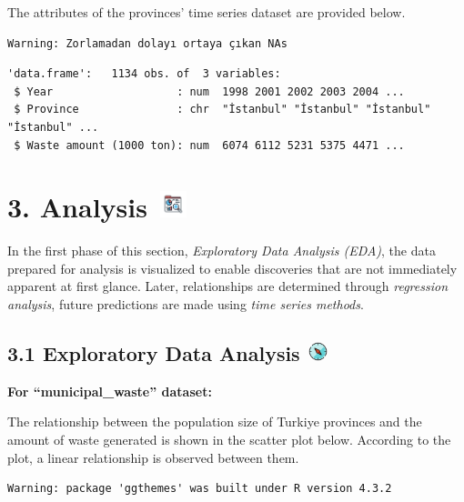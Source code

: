 \documentclass[
  11pt,
  a4paper,
  DIV=11,
  numbers=noendperiod]{scrartcl}
\begin{document}
The attributes of the provinces' time series dataset are provided below.

\begin{verbatim}
Warning: Zorlamadan dolayı ortaya çıkan NAs
\end{verbatim}

\begin{verbatim}
'data.frame':   1134 obs. of  3 variables:
 $ Year                   : num  1998 2001 2002 2003 2004 ...
 $ Province               : chr  "İstanbul" "İstanbul" "İstanbul" "İstanbul" ...
 $ Waste amount (1000 ton): num  6074 6112 5231 5375 4471 ...
\end{verbatim}

\section[{3. Analysis} ]{\texorpdfstring{{3. Analysis}
\protect\includegraphics[width=0.375in,height=0.30208in]{assets/images/analysis.jpg}}{3. Analysis }}\label{analysis}

In the first phase of this section, \emph{Exploratory Data Analysis
(EDA)}, the data prepared for analysis is visualized to enable
discoveries that are not immediately apparent at first glance. Later,
relationships are determined through \emph{regression analysis}, future
predictions are made using \emph{time series methods}.

\subsection[{3.1 Exploratory Data Analysis} ]{\texorpdfstring{{3.1
Exploratory Data Analysis}
\protect\includegraphics[width=0.23958in,height=0.21875in]{assets/images/EDA.jpg}}{3.1 Exploratory Data Analysis }}\label{exploratory-data-analysis}

{\textbf{For ``municipal\_waste'' dataset:}}

The relationship between the population size of Turkiye provinces and
the amount of waste generated is shown in the scatter plot below.
According to the plot, a linear relationship is observed between them.

\begin{verbatim}
Warning: package 'ggthemes' was built under R version 4.3.2
\end{verbatim}
\end{document}

